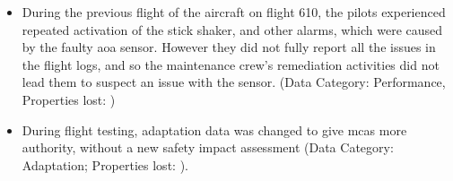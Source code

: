 \begin{itemize}
    \item During the previous flight of the aircraft on flight 610, the pilots experienced repeated activation of the stick shaker, and other alarms, which were caused by the faulty \gls{aoa} sensor.
      However they did not fully report all the issues in the flight logs, and so the maintenance crew's remediation activities did not lead them to suspect an issue with the sensor. (Data Category: Performance, Properties lost: )
    \item During flight testing, \gls{adaptation data} was changed to give \gls{mcas} more authority, without a new safety impact assessment (Data Category: Adaptation; Properties lost: ).
\end{itemize}


